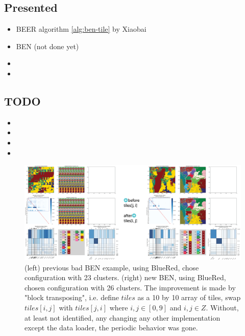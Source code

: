 

\begin{multicols}{2}
\subsection*{Presented}
\begin{itemize}
    \item BEER algorithm \ref{alg:ben-tile}  by Xiaobai
    \item BEN (not done yet)
    \item {}
    \item {}
\end{itemize}

\subsection*{TODO}
\begin{itemize}
    \item {}
    \item {}
    \item {}
    \item {}
\end{itemize}
\end{multicols}


\begin{figure}[htbp]
    \centering
    \includegraphics[width=\linewidth]{figures/24-10-07_BENimprove.png}
    \caption{(left) previous bad BEN example, using BlueRed, chose configuration with 23 clusters. (right) new BEN, using BlueRed, chosen configuration with 26 clusters. The improvement is made by "block transposing", i.e. define $tiles$ as a 10 by 10 array of tiles, swap $tiles[i,j]$ with $tiles[j,i]$ where $i,j \in [0,9]$ and $i,j \in Z$. Without, at least not identified, any changing any other implementation except the data loader, the periodic behavior was gone. } 
    \label{fig:24-10-07_BENimrove}
\end{figure}

\newpage

